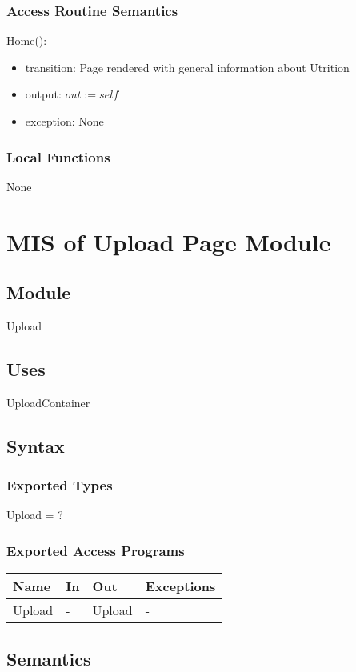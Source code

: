 \documentclass[12pt, titlepage]{article}
\begin{document}
\subsubsection{Access Routine Semantics}
\noindent Home():
\begin{itemize}
	\item transition: Page rendered with general information about Utrition
	\item output: $out := self$
	\item exception: None
\end{itemize}
\subsubsection{Local Functions}
None

\newpage

\section{MIS of Upload Page Module}
\subsection{Module}
Upload
\subsection{Uses}
UploadContainer
\subsection{Syntax}
\subsubsection{Exported Types}
Upload = ?
\subsubsection{Exported Access Programs}
\begin{center}
	\begin{tabular}{p{2cm} p{4cm} p{4cm} p{2cm}}
		\hline
		\textbf{Name} & \textbf{In} & \textbf{Out} & \textbf{Exceptions} \\
		\hline
		Upload & - & Upload & - \\
		\hline
	\end{tabular}
\end{center}
\subsection{Semantics}
\end{document}
